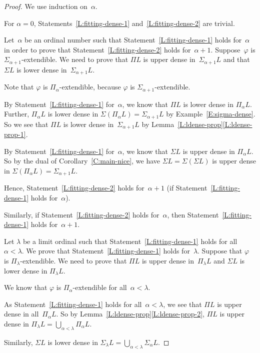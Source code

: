 \documentclass[main.tex]{subfiles}
\begin{document}
\begin{proof}
We use induction on~$\alpha$.

\vspace{.3em}
For $\alpha=0$,
Statements~\ref{L:fitting-dense-1}
and~\ref{L:fitting-dense-2} are trivial.

\vspace{.3em}
Let~$\alpha$ be an ordinal number
such that 
Statement~\ref{L:fitting-dense-1}
holds for~$\alpha$
in order to prove that
Statement~\ref{L:fitting-dense-2} holds for~$\alpha+1$.
Suppose~$\varphi$ is $\Sigma_{\alpha+1}$-extendible.
We need to prove that $\Pi L$ is upper dense in~$\Sigma_{\alpha+1} L$
and that $\Sigma L$ is lower dense in~$\Sigma_{\alpha+1} L$.

Note that 
$\varphi$ is $\Pi_\alpha$-extendible,
because  $\varphi$ is $\Sigma_{\alpha+1}$-extendible.

By Statement~\ref{L:fitting-dense-1} for~$\alpha$,
we know that $\Pi L$ is lower dense in $\Pi_\alpha L$.
Further, $\Pi_\alpha L$
is lower dense in $\Sigma(\Pi_\alpha L) = \Sigma_{\alpha+1} L$
by Example~\ref{E:sigma-dense}.
So we see that $\Pi L$ is lower dense in~$\Sigma_{\alpha+1} L$ 
by Lemma~\ref{L:ldense-prop}\ref{L:ldense-prop-1}.

By Statement~\ref{L:fitting-dense-1} for~$\alpha$,
we know that $\Sigma L$ is upper dense in $\Pi_\alpha L$.
So by the dual of Corollary~\ref{C:main-nice},
we have
$\Sigma L = \Sigma(\Sigma L)$ is upper dense in
$\Sigma(\Pi_\alpha L) = \Sigma_{\alpha+1} L$.

Hence, Statement~\ref{L:fitting-dense-2} holds for~$\alpha+1$
(if Statement~\ref{L:fitting-dense-1} holds for~$\alpha$).

Similarly,
if Statement~\ref{L:fitting-dense-2} holds for~$\alpha$,
then Statement~\ref{L:fitting-dense-1} holds for~$\alpha+1$.

\vspace{.3em}
Let
$\lambda$ be a limit ordinal
such that Statement~\ref{L:fitting-dense-1} holds
for all~$\alpha<\lambda$.
We prove that Statement~\ref{L:fitting-dense-1} holds
for~$\lambda$.
Suppose that $\varphi$ is $\Pi_\lambda$-extendible.
We need to prove that $\Pi L$ is upper dense in~$\Pi_\lambda L$
and $\Sigma L$ is lower dense in $\Pi_\lambda L$.

We know that $\varphi$ is $\Pi_\alpha$-extendible
for all~$\alpha < \lambda$.

As Statement~\ref{L:fitting-dense-1} holds for all~$\alpha <\lambda$,
we see that $\Pi L$ is upper dense in all~$\Pi_\alpha L$.
So by Lemma~\ref{L:ldense-prop}\ref{L:ldense-prop-2},
$\Pi L$ is upper dense in
 $\Pi_\lambda L = \bigcup_{\alpha <\lambda} \Pi_\alpha L$.

Similarly,
$\Sigma L$ is lower dense in
$\Sigma_\lambda L= \bigcup_{\alpha < \lambda} \Sigma_\alpha L$.
\end{proof}
\end{document}
